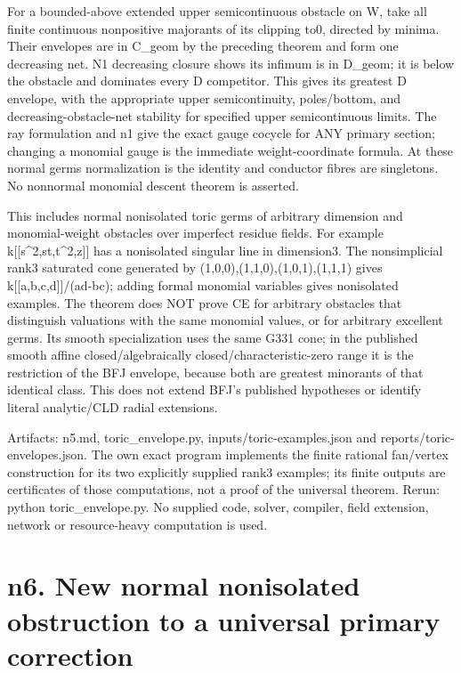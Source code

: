 \documentclass[11pt]{article}
\begin{document}
For a bounded-above extended upper semicontinuous obstacle on W, take all finite continuous nonpositive majorants of its clipping to0, directed by minima. Their envelopes are in C\_geom by the preceding theorem and form one decreasing net. N1 decreasing closure shows its infimum is in D\_geom; it is below the obstacle and dominates every D competitor. This gives its greatest D envelope, with the appropriate upper semicontinuity, poles/bottom, and decreasing-obstacle-net stability for specified upper semicontinuous limits. The ray formulation and n1 give the exact gauge cocycle for ANY primary section; changing a monomial gauge is the immediate weight-coordinate formula. At these normal germs normalization is the identity and conductor fibres are singletons. No nonnormal monomial descent theorem is asserted.

This includes normal nonisolated toric germs of arbitrary dimension and monomial-weight obstacles over imperfect residue fields. For example k[[s\textasciicircum{}2,st,t\textasciicircum{}2,z]] has a nonisolated singular line in dimension3. The nonsimplicial rank3 saturated cone generated by (1,0,0),(1,1,0),(1,0,1),(1,1,1) gives k[[a,b,c,d]]/(ad-bc); adding formal monomial variables gives nonisolated examples. The theorem does NOT prove CE for arbitrary obstacles that distinguish valuations with the same monomial values, or for arbitrary excellent germs. Its smooth specialization uses the same G331 cone; in the published smooth affine closed/algebraically closed/characteristic-zero range it is the restriction of the BFJ envelope, because both are greatest minorants of that identical class. This does not extend BFJ's published hypotheses or identify literal analytic/CLD radial extensions.

Artifacts: n5.md, toric\_envelope.py, inputs/toric-examples.json and reports/toric-envelopes.json. The own exact program implements the finite rational fan/vertex construction for its two explicitly supplied rank3 examples; its finite outputs are certificates of those computations, not a proof of the universal theorem. Rerun: python toric\_envelope.py. No supplied code, solver, compiler, field extension, network or resource-heavy computation is used.

\section{n6. New normal nonisolated obstruction to a universal primary correction}
\end{document}
